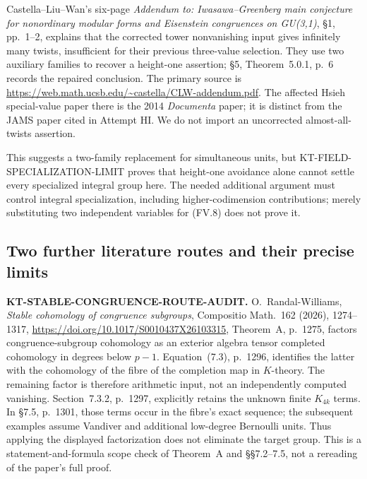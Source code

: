 \documentclass[11pt,a4paper]{article}
\theoremstyle{definition}
\renewcommand{\paragraph}[1]{\par\smallskip\noindent\textbf{#1}\quad\ignorespaces}
\begin{document}
Castella--Liu--Wan's six-page \emph{Addendum to: Iwasawa--Greenberg
main conjecture for nonordinary modular forms and Eisenstein
congruences on GU(3,1)}, \S1, pp.~1--2, explains that the corrected
tower nonvanishing input gives infinitely many twists, insufficient
for their previous three-value selection. They use two auxiliary
families to recover a height-one assertion; \S5, Theorem~5.0.1,
p.~6 records the repaired conclusion. The primary source is
\url{https://web.math.ucsb.edu/~castella/CLW-addendum.pdf}.
The affected Hsieh special-value paper there is the 2014
\emph{Documenta} paper; it is distinct from the JAMS paper
cited in Attempt HI. We do not import an uncorrected
almost-all-twists assertion.

This suggests a two-family replacement for simultaneous units,
but KT-FIELD-SPECIALIZATION-LIMIT proves that height-one avoidance
alone cannot settle every specialized integral group here.
The needed additional argument must control integral specialization,
including higher-codimension contributions; merely substituting
two independent variables for (FV.8) does not prove it.



\subsection{Two further literature routes and their precise limits}

\paragraph{KT-STABLE-CONGRUENCE-ROUTE-AUDIT.}
O.~Randal-Williams, \emph{Stable cohomology of congruence
subgroups}, Compositio Math.~162 (2026), 1274--1317,
\url{https://doi.org/10.1017/S0010437X26103315},
Theorem~A, p.~1275, factors congruence-subgroup cohomology
as an exterior algebra tensor completed cohomology in
degrees below $p-1$. Equation~(7.3), p.~1296, identifies
the latter with the cohomology of the fibre of the
completion map in $K$-theory. The remaining factor is
therefore arithmetic input, not an independently computed
vanishing. Section~7.3.2, p.~1297, explicitly retains the
unknown finite $K_{4k}$ terms. In \S7.5, p.~1301, those
terms occur in the fibre's exact sequence; the subsequent
examples assume Vandiver and additional low-degree
Bernoulli units. Thus applying the displayed factorization
does not eliminate the target group. This is a
statement-and-formula scope check of Theorem~A and
\S\S7.2--7.5, not a rereading of the paper's full proof.
\end{document}
